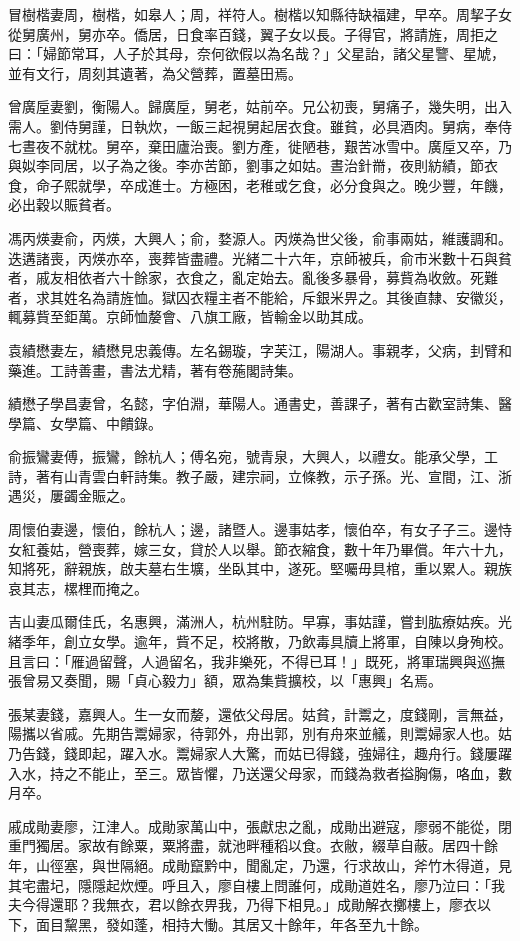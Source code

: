 \begin{pinyinscope}
冒樹楷妻周，樹楷，如皋人；周，祥符人。樹楷以知縣待缺福建，早卒。周挈子女從舅廣州，舅亦卒。僑居，日食率百錢，翼子女以長。子得官，將請旌，周拒之曰：「婦節常耳，人子於其母，奈何欲假以為名哉？」父星詒，諸父星譼、星虓，並有文行，周刻其遺著，為父營葬，置墓田焉。

曾廣垕妻劉，衡陽人。歸廣垕，舅老，姑前卒。兄公初喪，舅痛子，幾失明，出入需人。劉侍舅謹，日執炊，一飯三起視舅起居衣食。雖貧，必具酒肉。舅病，奉侍七晝夜不就枕。舅卒，棄田廬治喪。劉方產，徙陋巷，艱苦冰雪中。廣垕又卒，乃與姒李同居，以子為之後。李亦苦節，劉事之如姑。晝治針黹，夜則紡績，節衣食，命子熙就學，卒成進士。方極困，老稚或乞食，必分食與之。晚少豐，年饑，必出穀以賑貧者。

馮丙煐妻俞，丙煐，大興人；俞，婺源人。丙煐為世父後，俞事兩姑，維護調和。迭遘諸喪，丙煐亦卒，喪葬皆盡禮。光緒二十六年，京師被兵，俞市米數十石與貧者，戚友相依者六十餘家，衣食之，亂定始去。亂後多暴骨，募貲為收斂。死難者，求其姓名為請旌恤。獄囚衣糧主者不能給，斥銀米畀之。其後直隸、安徽災，輒募貲至鉅萬。京師恤嫠會、八旗工廠，皆輸金以助其成。

袁績懋妻左，績懋見忠義傳。左名錫璇，字芙江，陽湖人。事親孝，父病，刲臂和藥進。工詩善畫，書法尤精，著有卷葹閣詩集。

績懋子學昌妻曾，名懿，字伯淵，華陽人。通書史，善課子，著有古歡室詩集、醫學篇、女學篇、中饋錄。

俞振鸞妻傅，振鸞，餘杭人；傅名宛，號青泉，大興人，以禮女。能承父學，工詩，著有山青雲白軒詩集。教子嚴，建宗祠，立條教，示子孫。光、宣間，江、浙遇災，屢蠲金賑之。

周懷伯妻邊，懷伯，餘杭人；邊，諸暨人。邊事姑孝，懷伯卒，有女子子三。邊恃女紅養姑，營喪葬，嫁三女，貸於人以舉。節衣縮食，數十年乃畢償。年六十九，知將死，辭親族，啟夫墓右生壙，坐臥其中，遂死。堅囑毋具棺，重以累人。親族哀其志，樏梩而掩之。

吉山妻瓜爾佳氏，名惠興，滿洲人，杭州駐防。早寡，事姑謹，嘗刲肱療姑疾。光緒季年，創立女學。逾年，貲不足，校將散，乃飲毒具牘上將軍，自陳以身殉校。且言曰：「雁過留聲，人過留名，我非樂死，不得已耳！」既死，將軍瑞興與巡撫張曾易又奏聞，賜「貞心毅力」額，眾為集貲擴校，以「惠興」名焉。

張某妻錢，嘉興人。生一女而嫠，還依父母居。姑貧，計鬻之，度錢剛，言無益，陽攜以省戚。先期告鬻婦家，待郭外，舟出郭，別有舟來並艤，則鬻婦家人也。姑乃告錢，錢即起，躍入水。鬻婦家人大驚，而姑已得錢，強婦往，趣舟行。錢屢躍入水，持之不能止，至三。眾皆懼，乃送還父母家，而錢為救者搤胸傷，咯血，數月卒。

戚成勛妻廖，江津人。成勛家萬山中，張獻忠之亂，成勛出避寇，廖弱不能從，閉重門獨居。家故有餘粟，粟將盡，就池畔種稻以食。衣敝，綴草自蔽。居四十餘年，山徑塞，與世隔絕。成勛竄黔中，聞亂定，乃還，行求故山，斧竹木得道，見其宅盡圮，隱隱起炊煙。呼且入，廖自樓上問誰何，成勛道姓名，廖乃泣曰：「我夫今得還耶？我無衣，君以餘衣畀我，乃得下相見。」成勛解衣擲樓上，廖衣以下，面目黧黑，發如蓬，相持大慟。其居又十餘年，年各至九十餘。


\end{pinyinscope}
